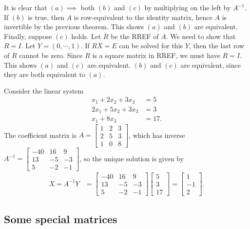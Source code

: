 \documentclass[12pt,letterpaper,reqno]{article}
\numberwithin{equation}{section}
\begin{document}
\begin{pf}
It is clear that $(a) \implies $ both $(b)$ and $(c)$ by multiplying on the left by $A^{-1}$. If $(b)$ is true, then $A$ is row-equivalent to the identity matrix, hence $A$ is invertible by the previous theorem. This shows $(a)$ and $(b)$ are equivalent. Finally, suppose $(c)$ holds. Let $R$ be the RREF of $A$. We need to show that $R=I$. Let $Y=(0,\cdots,1)$. If $RX=E$ can be solved for this $Y$, then the last row of $R$ cannot be zero. Since $R$ is a square matrix in RREF, we must have $R=I$. This shows $(a)$ and $(c)$ are equivalent. $(b)$ and $(c)$ are equivalent, since they are both equivalent to $(a)$.	
\end{pf}

\begin{example}
Consider the linear system
\begin{align*}
	x_1+2x_2+3x_3&=5 \\
	2x_1+5x_2+3x_3&=3 \\
	x_1+8x_3&=17.
\end{align*}
The coefficient matrix is $A=\begin{bmatrix}
		1 & 2 & 3 \\ 2 & 5 & 3 \\ 1 & 0 & 8
	\end{bmatrix}$, which has inverse $A^{-1}=\begin{bmatrix}
		-40 & 16 & 9 \\ 13 & -5 & -3 \\ 5 & -2 & -1
	\end{bmatrix}$, so the unique solution is given by
	\begin{align*}
		X=A^{-1}Y&=\begin{bmatrix}
		-40 & 16 & 9 \\ 13 & -5 & -3 \\ 5 & -2 & -1
	\end{bmatrix}\begin{bmatrix}
		5 \\ 3 \\ 17
	\end{bmatrix}=\begin{bmatrix}
		1 \\ -1 \\2
	\end{bmatrix}.
	\end{align*}	
\end{example}

\subsection{Some special matrices}
\end{document}
